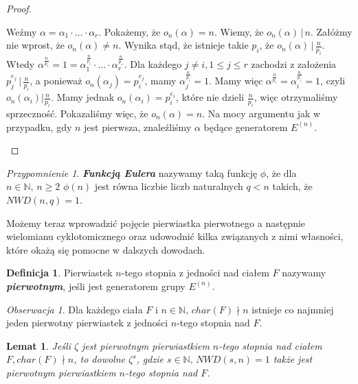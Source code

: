 \documentclass[declaration,shortabstract]{iithesis}
\theoremstyle{definition}
\newtheorem{definition}{Definicja}
\theoremstyle{remark} \newtheorem{observation}{Obserwacja}
\theoremstyle{plain} \newtheorem{theorem}{Twierdzenie}
\theoremstyle{plain} \newtheorem{lemma}{Lemat}
\theoremstyle{remark} \newtheorem*{remark*}{Uwaga}
\theoremstyle{reminder} \newtheorem*{reminder*}{Przypomnienie}
\begin{document}
\begin{proof}
\begin{enumerate}[label=Ad.\arabic*.,leftmargin=.4in]
\begin{enumerate}[label=Ad.3.\arabic*.]
		      	      Weźmy $\alpha = \alpha_1 \cdot \ldots \cdot \alpha_r$. Pokażemy, że $o_n(\alpha) = n$. Wiemy, że $o_n(\alpha) \, | \, n$. Załóżmy nie wprost, że $o_n(\alpha) \neq n$. Wynika stąd, że istnieje takie $p_i$, że $o_n(\alpha) \, | \, \frac{n}{p_i}$. Wtedy $\alpha^{\frac{n}{p_i}} = 1 = \alpha_1^{\frac{n}{p_i}} \cdot \dots \cdot \alpha_r^{\frac{n}{p_r}}$. Dla każdego $j \neq i, 1 \leq j \leq r$ zachodzi z założenia $p_j^{e_j} \, | \, \frac{n}{p_i}$, a ponieważ $o_n(\alpha_j) = p_i^{e_j}$, mamy $\alpha_j^{\frac{n}{p_i}} = 1$. Mamy więc $\alpha^{\frac{n}{p_i}} = \alpha_i^{\frac{n}{p_i}} = 1$, czyli $o_n(\alpha_i) | \frac{n}{p_i}$. Mamy jednak $o_n(\alpha_i) = p_i^{e_i}$, które nie dzieli $\frac{n}{p_i}$, więc otrzymaliśmy sprzeczność. Pokazaliśmy więc, że $o_n(\alpha) = n$. Na mocy argumentu jak w przypadku, gdy $n$ jest pierwsza, znaleźliśmy $\alpha$ będące generatorem $E^{(n)}$.
		      \end{enumerate}
	\end{enumerate}
\end{proof}
    

\begin{reminder*}
	\textbf{\textit{Funkcją Eulera}} nazywamy taką funkcję $\phi$, że dla $n \in \mathbb{N}, \, n \geq 2$ $\phi(n)$ jest równa liczbie liczb naturalnych $q < n$ takich, że $NWD(n, q) = 1$. 
\end{reminder*}

Możemy teraz wprowadzić pojęcie pierwiastka pierwotnego a następnie wielomianu cyklotomicznego oraz udowodnić kilka związanych z nimi własności, które okażą się pomocne w dalszych dowodach.

\begin{definition}
	Pierwiastek $n$-tego stopnia z jedności nad ciałem $F$ nazywamy \textbf{\textit{pierwotnym}}, jeśli jest generatorem grupy $E^{(n)}$.
\end{definition}
	
\begin{observation}
	Dla każdego ciała $F$ i $n \in \mathbb{N}, \, char(F) \nmid n$  istnieje co najmniej jeden pierwotny pierwiastek z jedności $n$-tego stopnia nad $F$.
\end{observation}
	
\begin{lemma}\label{pierwotne}
	Jeśli $\zeta$ jest pierwotnym pierwiastkiem $n$-tego stopnia nad ciałem $F, char(F) \nmid n$, to dowolne $\zeta^s$, gdzie $s \in \mathbb{N}, \, NWD(s, n) = 1$ także jest pierwotnym pierwiastkiem $n$-tego stopnia nad $F$.
\end{lemma}
	
\end{document}
